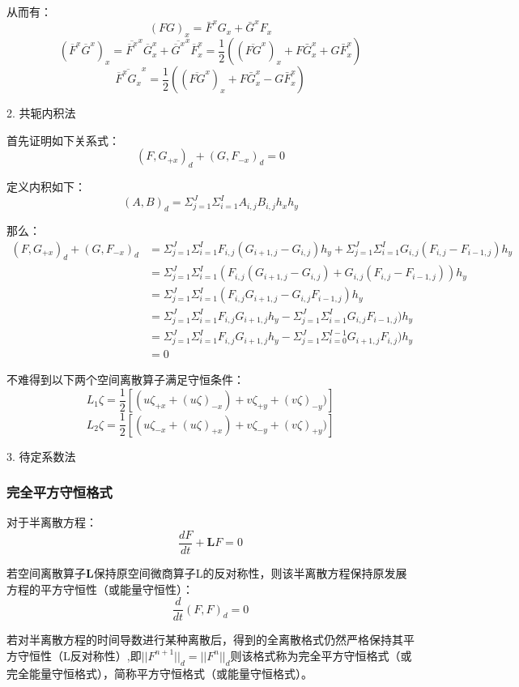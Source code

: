 \documentclass{article}
\begin{document}
从而有：
$$(FG)_x = \bar{F}^xG_x + \bar{G}^xF_x$$
$$(\overline{F}^x\overline{G}^x)_x = \overline{\overline{F}^x}^x\overline{G}^x_x + \overline{\overline{G}^x}^x\overline{F}^x_x = \frac{1}{2}((\overline{FG}^x)_x+F\bar{G}^x_x+G\bar{F}^x_x)$$
$$\overline{\overline{F}^xG_x}^x=\frac{1}{2}((\overline{FG}^x)_x+F\bar{G}^x_x-G\bar{F}^x_x)$$

2. 共轭内积法


首先证明如下关系式：
$$(F,G_{+x})_d + (G, F_{-x})_d = 0$$

定义内积如下：
$$(A,B)_d= \Sigma_{j=1}^{J}\Sigma_{i=1}^{I}A_{i,j}B_{i,j}h_xh_y$$

那么：
\begin{align}
    (F,G_{+x})_d + (G, F_{-x})_d &= \Sigma_{j=1}^{J}\Sigma_{i=1}^{I}F_{i,j}(G_{i+1,j}-G_{i,j})h_y + \Sigma_{j=1}^{J}\Sigma_{i=1}^{I}G_{i,j}(F_{i,j}-F_{i-1,j})h_y\\
    & = \Sigma_{j=1}^{J}\Sigma_{i=1}^{I}(F_{i,j}(G_{i+1,j}-G_{i,j}) + G_{i,j}(F_{i,j}-F_{i-1,j}))h_y\\
    & = \Sigma_{j=1}^{J}\Sigma_{i=1}^{I}(F_{i,j}G_{i+1,j} - G_{i,j}F_{i-1,j})h_y\\
    & = \Sigma_{j=1}^{J}\Sigma_{i=1}^{I}F_{i,j}G_{i+1,j}h_y - \Sigma_{j=1}^{J}\Sigma_{i=1}^{I}G_{i,j}F_{i-1,j})h_y\\
    & = \Sigma_{j=1}^{J}\Sigma_{i=1}^{I}F_{i,j}G_{i+1,j}h_y - \Sigma_{j=1}^{J}\Sigma_{i=0}^{I-1}G_{i+1,j}F_{i,j})h_y\\
    & = 0
\end{align}

不难得到以下两个空间离散算子满足守恒条件：
$$L_1\zeta = \frac{1}{2}[(u\zeta_{+x}+(u\zeta)_{-x})+v\zeta_{+y}+(v\zeta)_{-y})]$$
$$L_2\zeta = \frac{1}{2}[(u\zeta_{-x}+(u\zeta)_{+x})+v\zeta_{-y}+(v\zeta)_{+y})]$$

3. 待定系数法


\subsubsection{完全平方守恒格式}
对于半离散方程：
$$\frac{d F}{d t} + \mathbf{L}F = 0$$

若空间离散算子$\mathbf{L}$保持原空间微商算子L的反对称性，则该半离散方程保持原发展方程的平方守恒性（或能量守恒性）：
$$\frac{d}{dt}(F,F)_d = 0$$

若对半离散方程的时间导数进行某种离散后，得到的全离散格式仍然严格保持其平方守恒性（L反对称性）,即$||F^{n+1}||_d = ||F^n||_d$则该格式称为完全平方守恒格式（或完全能量守恒格式），简称平方守恒格式（或能量守恒格式）。
\end{document}
